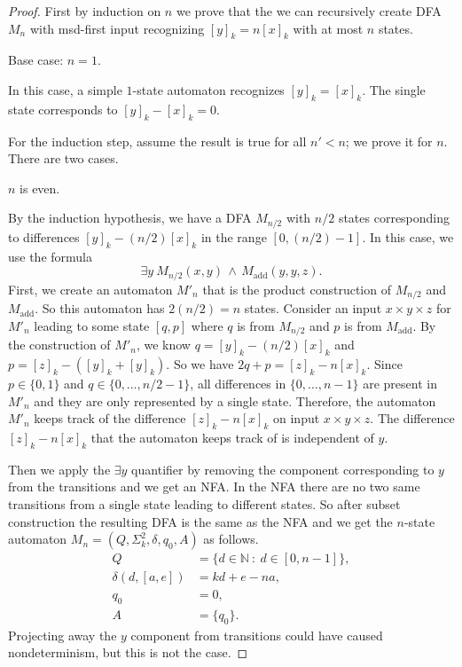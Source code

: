 \documentclass[10pt,a4paper]{amsart}
\def\AND{\, \wedge \,}
\def\add{\text{add}}
\def\suchthat{\ : \ }
\begin{document}
\begin{proof}
First by induction on $n$ we prove that the we can recursively create DFA $M_n$ with msd-first input recognizing $[y]_k = n[x]_k$ with at most $n$ states.

Base case: $n=1$.

In this case, a simple $1$-state automaton recognizes $[y]_k=[x]_k$. The single state corresponds to $[y]_k - [x]_k = 0$.

For the induction step, assume the result is true for all $n'<n$; we prove it for $n$.
There are two cases.

\bigskip{} $n$ is even.

By the induction hypothesis, we have a DFA $M_{n/2}$ with $n/2$ states corresponding to differences $[y]_k - (n/2)[x]_k$ in the range $[0, (n/2)-1]$.
In this case, we use the formula
$$ \exists y \ M_{n/2}(x,y) \AND M_{\add}(y, y, z).$$
First, we create an automaton $M'_{n}$ that is the product construction of $M_{n/2}$ and $M_{\add}$. So this automaton has $2(n/2) = n$ states. Consider an input $x \times y \times z$ for $M'_{n}$ leading to some state $[q, p]$ where $q$ is from $M_{n/2}$ and $p$ is from $M_{\add}$. By the construction of $M'_{n}$, we know $q=[y]_k - (n/2)[x]_k$ and $p=[z]_k - ([y]_k + [y]_k)$. So we have $2q+p = [z]_k - n[x]_k$. Since $p \in \{0, 1\}$ and $q \in \{0, \ldots, n/2 - 1\}$, all differences in $\{0, \ldots, n-1\}$ are present in $M'_{n}$ and they are only represented by a single state.
Therefore, the automaton $M'_{n}$ keeps track of the difference $[z]_k - n[x]_k$ on input $x \times y \times z$. The difference $[z]_k - n[x]_k$ that the automaton keeps track of is independent of $y$.

Then we apply the $\exists y$ quantifier by removing the component corresponding to $y$ from the transitions and we get an NFA. In the NFA there are no two same transitions from a single state leading to different states. So after subset construction the resulting DFA is the same as the NFA and we get the $n$-state automaton $M_{n}=(Q, \Sigma^2_k, \delta, q_0, A)$ as follows.
\begin{align*}
Q &= \{ d \in \mathbb{N}  \suchthat d \in [0, n-1] \}, \\
\delta(d, [a, e]) &= kd + e - n
a, \\
q_0 &= 0, \\
A &= \{q_0\}.
\end{align*}
Projecting away the $y$ component from transitions could have caused nondeterminism, but this is not the case.


\end{proof}
\end{document}
